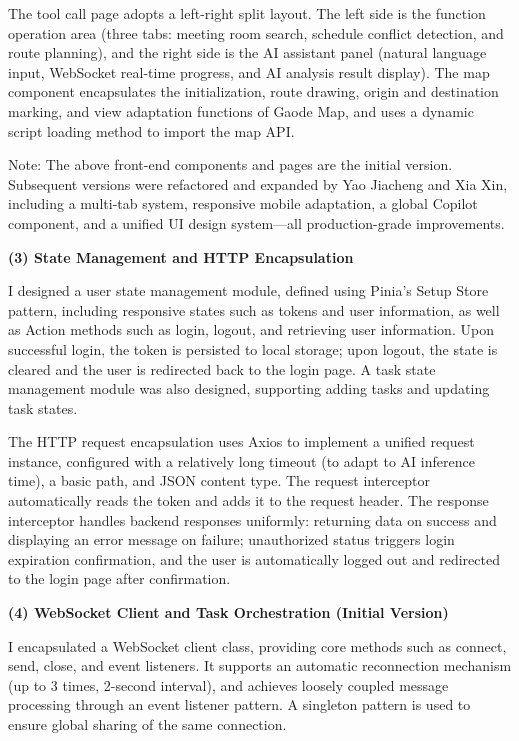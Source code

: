 The tool call page adopts a left-right split layout. The left side is the function operation area (three tabs: meeting room search, schedule conflict detection, and route planning), and the right side is the AI assistant panel (natural language input, WebSocket real-time progress, and AI analysis result display). The map component encapsulates the initialization, route drawing, origin and destination marking, and view adaptation functions of Gaode Map, and uses a dynamic script loading method to import the map API.

Note: The above front-end components and pages are the initial version. Subsequent versions were refactored and expanded by Yao Jiacheng and Xia Xin, including a multi-tab system, responsive mobile adaptation, a global Copilot component, and a unified UI design system—all production-grade improvements.

\textbf{(3) State Management and HTTP Encapsulation}

I designed a user state management module, defined using Pinia's Setup Store pattern, including responsive states such as tokens and user information, as well as Action methods such as login, logout, and retrieving user information. Upon successful login, the token is persisted to local storage; upon logout, the state is cleared and the user is redirected back to the login page. A task state management module was also designed, supporting adding tasks and updating task states.

The HTTP request encapsulation uses Axios to implement a unified request instance, configured with a relatively long timeout (to adapt to AI inference time), a basic path, and JSON content type. The request interceptor automatically reads the token and adds it to the request header. The response interceptor handles backend responses uniformly: returning data on success and displaying an error message on failure; unauthorized status triggers login expiration confirmation, and the user is automatically logged out and redirected to the login page after confirmation.

\textbf{(4) WebSocket Client and Task Orchestration (Initial Version)}

I encapsulated a WebSocket client class, providing core methods such as connect, send, close, and event listeners. It supports an automatic reconnection mechanism (up to 3 times, 2-second interval), and achieves loosely coupled message processing through an event listener pattern. A singleton pattern is used to ensure global sharing of the same connection.

